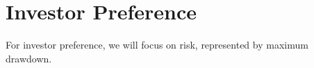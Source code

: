 \section{Investor Preference}
For investor preference, we will focus on risk, represented by maximum drawdown. 